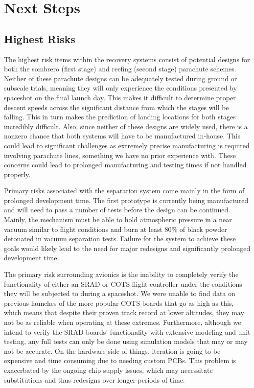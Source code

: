 \section{Next Steps} \label{section:nextsteps}
\subsection{Highest Risks}


The highest risk items within the recovery systems consist of potential designs for both the sombrero (first stage) and reefing (second stage) parachute schemes. Neither of these parachute designs can be adequately tested during ground or subscale trials, meaning they will only experience the conditions presented by spaceshot on the final launch day. This makes it difficult to determine proper descent speeds across the significant distance from which the stages will be falling. This in turn makes the prediction of landing locations for both stages incredibly difficult. Also, since neither of these designs are widely used, there is a nonzero chance that both systems will have to be manufactured in-house. This could lead to significant challenges as extremely precise manufacturing is required involving parachute lines, something we have no prior experience with. These concerns could lead to prolonged manufacturing and testing times if not handled properly.

Primary risks associated with the separation system come mainly in the form of prolonged development time. The first prototype is currently being manufactured and will need to pass a number of tests before the design can be continued. Mainly, the mechanism must be able to hold atmospheric pressure in a near vacuum similar to flight conditions and burn at least 80\% of black powder detonated in vacuum separation tests. Failure for the system to achieve these goals would likely lead to the need for major redesigns and significantly prolonged development time.


The primary risk surrounding avionics is the inability to completely verify the functionality of either an SRAD or COTS flight controller under the conditions they will be subjected to during a spaceshot. We were unable to find data on previous launches of the more popular COTS boards that go as high as this, which means that despite their proven track record at lower altitudes, they may not be as reliable when operating at these extremes. Furthermore, although we intend to verify the SRAD boards’ functionality with extensive modeling and unit testing, any full tests can only be done using simulation models that may or may not be accurate. On the hardware side of things, iteration is going to be expensive and time consuming due to needing custom PCBs. This problem is exacerbated by the ongoing chip supply issues, which may necessitate substitutions and thus redesigns over longer periods of time.



